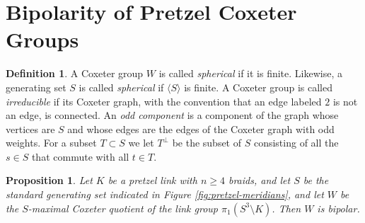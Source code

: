 \documentclass[11pt]{article}
\newtheorem{proposition}[theorem]{Proposition}
\theoremstyle{definition}
\newtheorem{definition}[theorem]{Definition}
\begin{document}
\section{Bipolarity of Pretzel Coxeter Groups}

\begin{definition}
A Coxeter group $W$ is called \textit{spherical} if it is finite. Likewise, a generating set $S$ is called \textit{spherical} if $\langle S \rangle$ is finite. A Coxeter group is called \textit{irreducible} if its Coxeter graph, with the convention that an edge labeled $2$ is not an edge, is connected. An \textit{odd component} is a component of the graph whose vertices are $S$ and whose edges are the edges of the Coxeter graph with odd weights. For a subset $T\subset S$ we let $T^\perp$ be the subset of $S$ consisting of all the $s \in S$ that commute with all $t \in T$.
\end{definition}


\begin{proposition}\label{prop:coxeter-quotient-bipolar}
Let $K$ be a pretzel link with $n \geq 4$ braids, and let $S$ be the standard generating set indicated in Figure \ref{fig:pretzel-meridians}, and let $W$ be the $S$-maximal Coxeter quotient of the link group $\pi_1(S^3 \setminus K)$. Then $W$ is bipolar.
\end{proposition}
\end{document}

